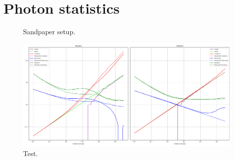 \documentclass[main.tex]{subfiles}
\begin{document}
\section{Photon statistics}




\begin{figure}[ht]
\centering

\caption{Sandpaper setup.}
\label{fig:sandpaper}
\end{figure}




\begin{figure}
    \includegraphics[width=\textwidth]{figures/photon_statistics.pdf}
    \caption{Test.}
    \label{fig:photon_statistics}
\end{figure}
\end{document}
